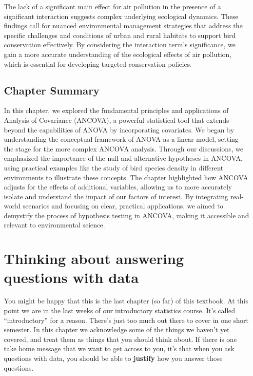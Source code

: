\documentclass[
  letterpaper,
  DIV=11,
  numbers=noendperiod]{scrreprt}
\begin{document}
The lack of a significant main effect for air pollution in the presence
of a significant interaction suggests complex underlying ecological
dynamics. These findings call for nuanced environmental management
strategies that address the specific challenges and conditions of urban
and rural habitats to support bird conservation effectively. By
considering the interaction term's significance, we gain a more accurate
understanding of the ecological effects of air pollution, which is
essential for developing targeted conservation policies.

\section{Chapter Summary}\label{chapter-summary}

In this chapter, we explored the fundamental principles and applications
of Analysis of Covariance (ANCOVA), a powerful statistical tool that
extends beyond the capabilities of ANOVA by incorporating covariates. We
began by understanding the conceptual framework of ANOVA as a linear
model, setting the stage for the more complex ANCOVA analysis. Through
our discussions, we emphasized the importance of the null and
alternative hypotheses in ANCOVA, using practical examples like the
study of bird species density in different environments to illustrate
these concepts. The chapter highlighted how ANCOVA adjusts for the
effects of additional variables, allowing us to more accurately isolate
and understand the impact of our factors of interest. By integrating
real-world scenarios and focusing on clear, practical applications, we
aimed to demystify the process of hypothesis testing in ANCOVA, making
it accessible and relevant to environmental science.


\chapter{Thinking about answering questions with
data}\label{thinking-about-answering-questions-with-data}

You might be happy that this is the last chapter (so far) of this
textbook. At this point we are in the last weeks of our introductory
statistics course. It's called ``introductory'' for a reason. There's
just too much out there to cover in one short semester. In this chapter
we acknowledge some of the things we haven't yet covered, and treat them
as things that you should think about. If there is one take home message
that we want to get across to you, it's that when you ask questions with
data, you should be able to \textbf{justify} how you answer those
questions.
\end{document}
